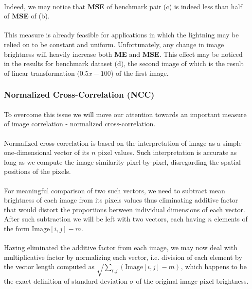 \paragraph*{}
Indeed, we may notice that \textbf{MSE} of benchmark pair (c) is indeed less than half of \textbf{MSE} of (b).

\paragraph*{}
This measure is already feasible for applications in which the lightning may be relied on to be constant and uniform. Unfortunately, any change in image brightness will heavily increase both \textbf{ME} and \textbf{MSE}. This effect may be noticed in the results for benchmark dataset (d), the second image of which is the result of linear transformation ($0.5x - 100$) of the first image.

\subsubsection{Normalized Cross-Correlation (NCC)}

\paragraph*{}
To overcome this issue we will move our attention towards an important measure of image correlation - normalized cross-correlation. 

\paragraph*{}
Normalized cross-correlation is based on the interpretation of image as a simple one-dimensional vector of its $n$ pixel values. Such interpretation is accurate as long as we compute the image similarity pixel-by-pixel, disregarding the spatial positions of the pixels.

\paragraph*{}
For meaningful comparison of two such vectors, we need to subtract mean brightness of each image from its pixels values thus eliminating additive factor that would distort the proportions between individual dimensions of each vector. After such subtraction we will be left with two vectors, each having $n$ elements of the form $\mbox{Image}[i,j] - m$.

\paragraph*{}
Having eliminated the additive factor from each image, we may now deal with multiplicative factor by normalizing each vector, i.e. division of each element by the vector length computed as $\sqrt{\sum_{i,j} (\mbox{Image}[i,j] - m)}$, which happens to be the exact definition of standard deviation $\sigma$ of the original image pixel brightness.

